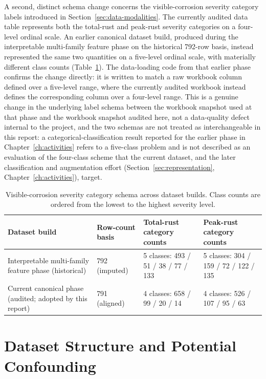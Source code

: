 A second, distinct schema change concerns the visible-corrosion severity
category labels introduced in Section~\ref{sec:data-modalities}. The
currently audited data table represents both the total-rust and peak-rust
severity categories on a four-level ordinal scale. An earlier canonical
dataset build, produced during the interpretable multi-family feature
phase on the historical 792-row basis, instead represented the same two
quantities on a five-level ordinal scale, with materially different class
counts (Table~\ref{tab:category-schema}). The data-loading code from that
earlier phase confirms the change directly: it is written to match a raw
workbook column defined over a five-level range, where the currently
audited workbook instead defines the corresponding column over a
four-level range. This is a genuine change in the underlying label schema
between the workbook snapshot used at that phase and the workbook snapshot
audited here, not a data-quality defect internal to the project, and the
two schemas are not treated as interchangeable in this report: a
categorical-classification result reported for the earlier phase in
Chapter~\ref{ch:activities} refers to a five-class problem and is not
described as an evaluation of the four-class scheme that the current
dataset, and the later classification and augmentation effort
(Section~\ref{sec:representation}, Chapter~\ref{ch:activities}), target.

\begin{table}[htbp]
\centering
\caption{Visible-corrosion severity category schema across dataset
builds. Class counts are ordered from the lowest to the highest severity
level.}
\label{tab:category-schema}
\begin{tabular}{p{4.2cm}p{2.1cm}p{3.1cm}p{3.1cm}}
\toprule
Dataset build & Row-count basis & Total-rust category counts & Peak-rust
category counts \\
\midrule
Interpretable multi-family feature phase (historical) & 792 (imputed) &
5 classes: 493 / 51 / 38 / 77 / 133 & 5 classes: 304 / 159 / 72 / 122 /
135 \\
Current canonical phase (audited; adopted by this report) & 791
(aligned) & 4 classes: 658 / 99 / 20 / 14 & 4 classes: 526 / 107 / 95 /
63 \\
\bottomrule
\end{tabular}
\end{table}

\section{Dataset Structure and Potential Confounding}
\label{sec:confounding}

